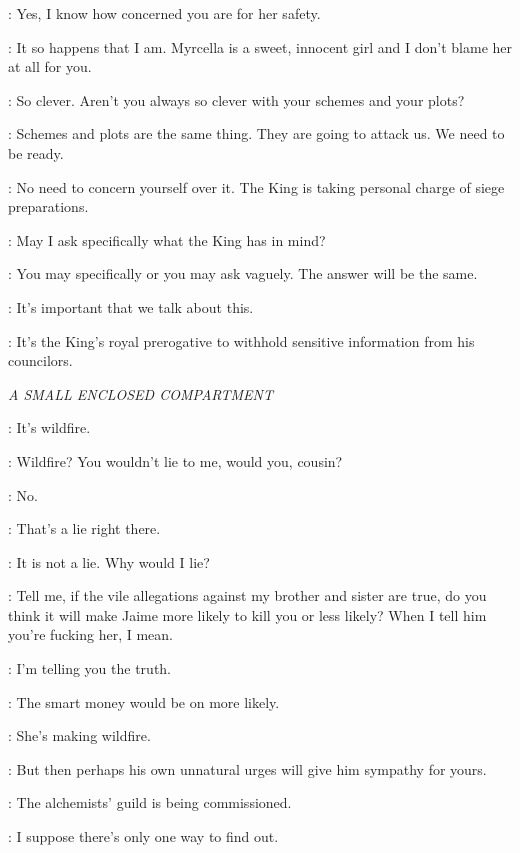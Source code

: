 \CERSEI: Yes, I know how concerned you are for her safety. 

\TYRION: It so happens that I am. Myrcella is a sweet, innocent girl and I don't blame her at all for you. 

\CERSEI: So clever. Aren't you always so clever with your schemes and your plots? 

\TYRION: Schemes and plots are the same thing. They are going to attack us. We need to be ready. 

\CERSEI: No need to concern yourself over it. The King is taking personal charge of siege preparations. 

\TYRION: May I ask specifically what the King has in mind? 

\CERSEI: You may specifically or you may ask vaguely. The answer will be the same. 

\TYRION: It's important that we talk about this. 

\CERSEI: It's the King's royal prerogative to withhold sensitive information from his councilors. 



\scene

\textit{A SMALL ENCLOSED COMPARTMENT} 


\LANCEL: It's wildfire. 

\TYRION: Wildfire? You wouldn't lie to me, would you, cousin? 

\LANCEL: No. 

\TYRION: That's a lie right there. 

\LANCEL: It is not a lie. Why would I lie? 

\TYRION: Tell me, if the vile allegations against my brother and sister are true, do you think it will make Jaime more likely to kill you or less likely? When I tell him you're fucking her, I mean. 

\LANCEL: I'm telling you the truth. 

\TYRION: The smart money would be on more likely. 

\LANCEL: She's making wildfire. 

\TYRION: But then perhaps his own unnatural urges will give him sympathy for yours. 

\LANCEL: The alchemists' guild is being commissioned. 

\TYRION: I suppose there's only one way to find out. 

